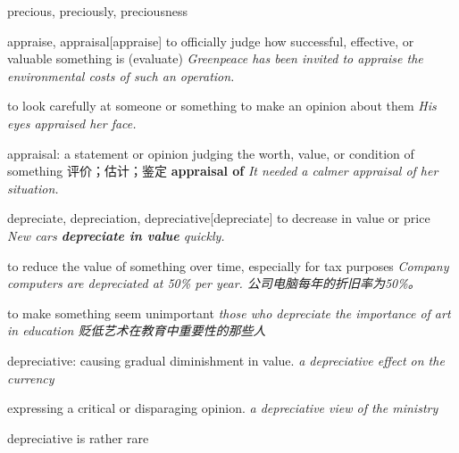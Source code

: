 \begin{RefWord}{precious, preciously, preciousness}
\end{RefWord}

\begin{RefWord}{appraise, appraisal}[appraise]
    to officially judge how successful, effective, or valuable something is (evaluate)
    \textit{Greenpeace has been invited to appraise the environmental costs of such an operation.}

    to look carefully at someone or something to make an opinion about them
    \textit{His eyes appraised her face.}

    appraisal: a statement or opinion judging the worth, value, or condition of something 评价；估计；鉴定
    \textbf{appraisal of}
    \textit{It needed a calmer appraisal of her situation.}
\end{RefWord}

\begin{RefWord}{depreciate, depreciation, depreciative}[depreciate]
    to decrease in value or price
    \textit{New cars \textbf{depreciate in value} quickly.}

    to reduce the value of something over time, especially for tax purposes
    \textit{Company computers are depreciated at 50\% per year. 公司电脑每年的折旧率为50\%。}

    to make something seem unimportant
    \textit{those who depreciate the importance of art in education 贬低艺术在教育中重要性的那些人}

    depreciative: causing gradual diminishment in value.
    \textit{a depreciative effect on the currency}
    
    expressing a critical or disparaging opinion.
    \textit{a depreciative view of the ministry}

    \begin{remark}
        depreciative is rather rare
    \end{remark}
\end{RefWord}